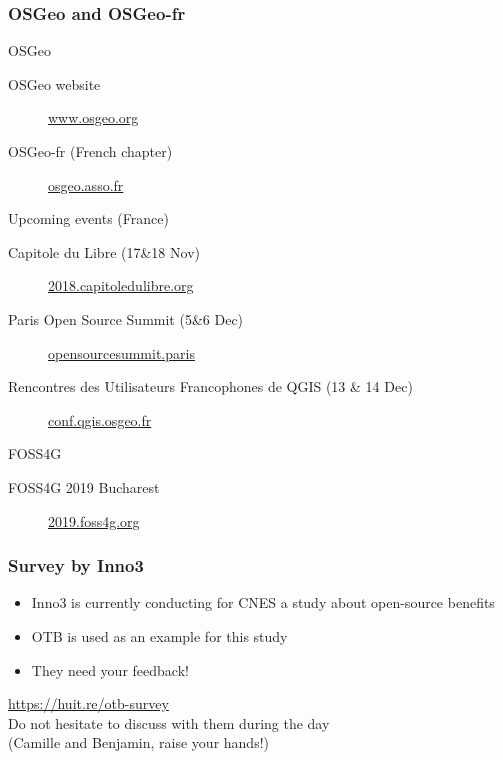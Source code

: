 \documentclass[8pt]{beamer}
\begin{document}
\begin{frame}
  \frametitle{OSGeo and OSGeo-fr}
  \begin{block}{OSGeo}
    \vspace{-0.2cm}
    \begin{description}
    \item[OSGeo website] \href{https://www.osgeo.org/}{www.osgeo.org}
    \item[OSGeo-fr (French chapter)] \href{https://www.osgeo.asso.fr/}{osgeo.asso.fr}
    \end{description}
  \end{block}
  \vspace{-0.2cm}
  \begin{block}{Upcoming events (France)}
    \vspace{-0.2cm}
    \begin{description}
    \item[Capitole du Libre (17\&18 Nov)] \href{https://2018.capitoledulibre.org/}{2018.capitoledulibre.org}
    \item[Paris Open Source Summit (5\&6 Dec)] \href{https://www.opensourcesummit.paris/}{opensourcesummit.paris}
    \item[Rencontres des Utilisateurs Francophones de QGIS (13 \& 14 Dec)] \href{http://conf.qgis.osgeo.fr/}{conf.qgis.osgeo.fr}
    \end{description}
  \end{block}
  \vspace{-0.2cm}
  \begin{block}{FOSS4G}
    \vspace{-0.2cm}
    \begin{description}
    \item[FOSS4G 2019 Bucharest] \href{https://2019.foss4g.org/}{2019.foss4g.org}
    \end{description}
  \end{block}

\end{frame}

\begin{frame}
\frametitle{Survey by Inno3}
\begin{itemize}
\item Inno3 is currently conducting for CNES a study about open-source benefits
\item OTB is used as an example for this study
\item \color{red} They need your feedback! \color{red}
\end{itemize}

\begin{center}
  \begin{large}
    \url{https://huit.re/otb-survey}\\
    \vspace{0.5cm}
    Do not hesitate to discuss with them during the day \\
    \vspace{0.5cm}
    (Camille and Benjamin, raise your hands!)
    \end{large}
\end{center}

\end{frame}
\end{document}
